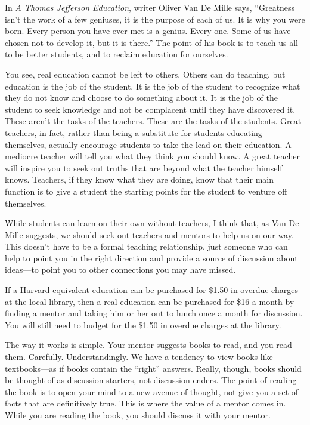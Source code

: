 In \textit{A Thomas Jefferson Education}, writer Oliver Van De Mille
says, “Greatness isn’t the work of a few geniuses, it is the purpose of
each of us. It is why you were born. Every person you have ever met is
a genius. Every one. Some of us have chosen not to develop it, but it
is there.”  The point of his book is to teach us all to be better
students, and to reclaim education for ourselves.

You see, real education cannot be left to others. Others can do
teaching, but education is the job of the student. It is the job of the
student to recognize what they do not know and choose to do something
about it. It is the job of the student to seek knowledge and not be
complacent until they have discovered it. These aren’t the tasks of the
teachers. These are the tasks of the students. Great teachers, in fact,
rather than being a substitute for students educating themselves,
actually encourage students to take the lead on their education. A
mediocre teacher will tell you what they think you should know. A great
teacher will inspire you to seek out truths that are beyond what the
teacher himself knows. Teachers, if they know what they are doing, know
that their main function is to give a student the starting points for
the student to venture off themselves.

While students can learn on their own without teachers, I think that, as
Van De Mille suggests, we should seek out teachers and mentors to help
us on our way. This doesn’t have to be a formal teaching relationship,
just someone who can help to point you in the right direction and
provide a source of discussion about ideas—to point you to other
connections you may have missed.

If a Harvard-equivalent education can be purchased for \$1.50 in overdue
charges at the local library, then a real education can be purchased
for \$16 a month by finding a mentor and taking him or her out to lunch
once a month for discussion. You will still need to budget for the
\$1.50 in overdue charges at the library.

The way it works is simple. Your mentor suggests books to read, and you
read them. Carefully. Understandingly. We have a tendency to view books
like textbooks—as if books contain the “right” answers. Really, though,
books should be thought of as discussion starters, not discussion
enders. The point of reading the book is to open your mind to a new
avenue of thought, not give you a set of facts that are definitively
true. This is where the value of a mentor comes in. While you are
reading the book, you should discuss it with your mentor.


